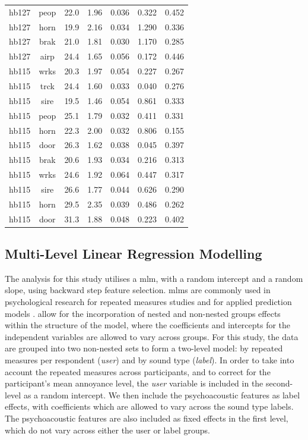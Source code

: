 \begin{table}
{\begin{tabular}{ccccccc}
hb127 & peop & 22.0 & 1.96 & 0.036 & 0.322 & 0.452 \\
hb127 & horn & 19.9 & 2.16 & 0.034 & 1.290 & 0.336 \\
hb127 & brak & 21.0 & 1.81 & 0.030 & 1.170 & 0.285 \\
hb127 & airp & 24.4 & 1.65 & 0.056 & 0.172 & 0.446 \\ 
\hline
hb115 & wrks & 20.3 & 1.97 & 0.054 & 0.227 & 0.267 \\
hb115 & trck & 24.4 & 1.60 & 0.033 & 0.040 & 0.276 \\
hb115 & sire & 19.5 & 1.46 & 0.054 & 0.861 & 0.333 \\
hb115 & peop & 25.1 & 1.79 & 0.032 & 0.411 & 0.331 \\
hb115 & horn & 22.3 & 2.00 & 0.032 & 0.806 & 0.155 \\
hb115 & door & 26.3 & 1.62 & 0.038 & 0.045 & 0.397 \\
hb115 & brak & 20.6 & 1.93 & 0.034 & 0.216 & 0.313 \\ 
\hline
hb115 & wrks & 24.6 & 1.92 & 0.064 & 0.447 & 0.317 \\
hb115 & sire & 26.6 & 1.77 & 0.044 & 0.626 & 0.290 \\
hb115 & horn & 29.5 & 2.35 & 0.039 & 0.486 & 0.262 \\
hb115 & door & 31.3 & 1.88 & 0.048 & 0.223 & 0.402 \\
\bottomrule
\end{tabular}
}
\end{table}

\subsection{Multi-Level Linear Regression Modelling}

The analysis for this study utilises a \gls{mlm}, with a random intercept and a random slope, using backward step feature selection. \glspl{mlm} are commonly used in psychological research for repeated measures studies \citep{Quene2004multi,VolpertEsmond2021Using} and for applied prediction models \citep{Gelman2006Multilevel,Frees2006Multilevel}.  allow for the incorporation of nested and non-nested groups effects within the structure of the model, where the coefficients and intercepts for the independent variables are allowed to vary across groups. For this study, the data are grouped into two non-nested sets to form a two-level model: by repeated measures per respondent (\emph{user}) and by sound type (\emph{label}). In order to take into account the repeated measures across participants, and to correct for the participant's mean annoyance level, the \emph{user} variable is included in the second-level as a random intercept. We then include the psychoacoustic features as label effects, with coefficients which are allowed to vary across the sound type labels. The psychoacoustic features are also included as fixed effects in the first level, which do not vary across either the user or label groups.

